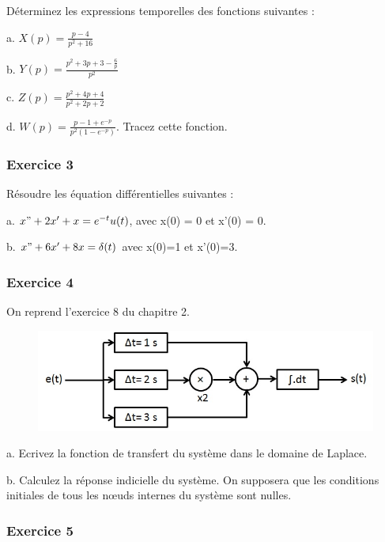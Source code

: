 	Déterminez les expressions temporelles des fonctions suivantes :
	
	a. $X(p)=\frac{p-4}{p^{2}+16}$ 
	
	b. $Y(p) = \frac{p^{2}+3p+3-\frac{6}{p}}{p^{2}}$ 
	
	c. $Z(p) = \frac{p^{2}+4p+4}{p^{2}+2p+2}$
	
	d. $W(p) = \frac{p-1+e^{-p}}{p^{2}(1-e^{-p})}$. Tracez cette fonction.
	
	
	\vspace{1\baselineskip}
	
	\subsubsection{Exercice 3}
	
	Résoudre les équation différentielles suivantes :
	
	a. $x"+2x'+x=e^{-t}u(t)$, avec x(0) = 0 et x'(0) = 0. 
	
	b. $x"+6x'+8x=\delta(t)$ avec x(0)=1 et x'(0)=3. 
	
	\vspace{1\baselineskip}
	
	
	\subsubsection{Exercice 4}
	
	On reprend l'exercice 8 du chapitre 2.

	
	\begin{figure}[h!]
		\centering
		\includegraphics[scale=0.5]{images/Exo_2_6.jpg} 
	\end{figure}
	
	a. Ecrivez la fonction de transfert du système dans le domaine de Laplace.
	
	b. Calculez la réponse indicielle du système. On supposera que les conditions initiales de tous les nœuds internes du système sont nulles. 
	
	
	\vspace{1\baselineskip}
	
	\subsubsection{Exercice 5}
	
